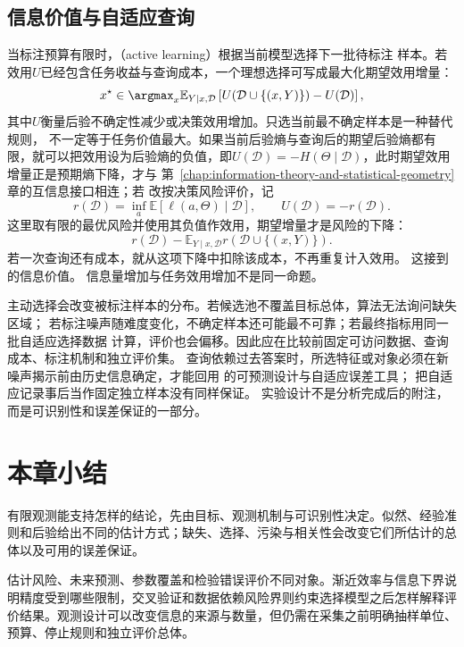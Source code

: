 \subsection{信息价值与自适应查询}
当标注预算有限时，（active learning）根据当前模型选择下一批待标注
样本。若效用\(U\)已经包含任务收益与查询成本，一个理想选择可写成最大化期望效用增量：
\[
  x^\star\in\argmax_x
  \mathbb{E}_{Y\mid x,\mathcal D}
  \left[
    U(\mathcal D\cup\{(x,Y)\})-U(\mathcal D)
  \right],
\]
其中\(U\)衡量后验不确定性减少或决策效用增加。只选当前最不确定样本是一种替代规则，
不一定等于任务价值最大。如果当前后验熵与查询后的期望后验熵都有限，就可以把效用设为后验熵的负值，即\(U(\mathcal D)=-H(\Theta\mid\mathcal D)\)，此时期望效用增量正是预期熵下降，才与
第~\ref{chap:information-theory-and-statistical-geometry}章的互信息接口相连；若
改按决策风险评价，记
\[
 r(\mathcal D)=\inf_a\mathbb E[\ell(a,\Theta)\mid\mathcal D],
 \qquad U(\mathcal D)=-r(\mathcal D).
\]
这里取有限的最优风险并使用其负值作效用，期望增量才是风险的下降：
\[
 r(\mathcal D)-
 \mathbb E_{Y\mid x,\mathcal D}r(\mathcal D\cup\{(x,Y)\}).
\]
若一次查询还有成本，就从这项下降中扣除该成本，不再重复计入效用。
这接到的信息价值。
信息量增加与任务效用增加不是同一命题。

主动选择会改变被标注样本的分布。若候选池不覆盖目标总体，算法无法询问缺失区域；
若标注噪声随难度变化，不确定样本还可能最不可靠；若最终指标用同一批自适应选择数据
计算，评价也会偏移。因此应在比较前固定可访问数据、查询成本、标注机制和独立评价集。
查询依赖过去答案时，所选特征或对象必须在新噪声揭示前由历史信息确定，才能回用
的可预测设计与自适应误差工具；
把自适应记录事后当作固定独立样本没有同样保证。
实验设计不是分析完成后的附注，而是可识别性和误差保证的一部分。

\section{本章小结}
\label{sec:statistics-summary}
有限观测能支持怎样的结论，先由目标、观测机制与可识别性决定。似然、经验准则和后验给出不同的估计方式；缺失、选择、污染与相关性会改变它们所估计的总体以及可用的误差保证。

估计风险、未来预测、参数覆盖和检验错误评价不同对象。渐近效率与信息下界说明精度受到哪些限制，交叉验证和数据依赖风险界则约束选择模型之后怎样解释评价结果。观测设计可以改变信息的来源与数量，但仍需在采集之前明确抽样单位、预算、停止规则和独立评价总体。
